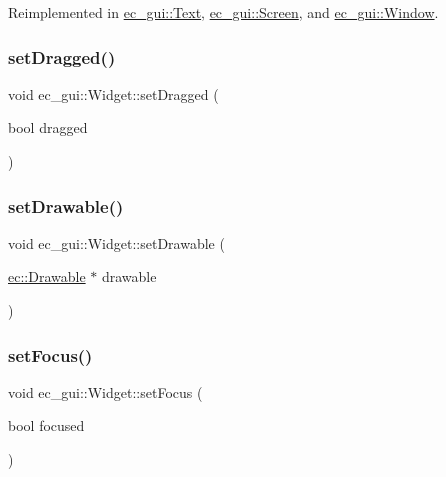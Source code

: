 Reimplemented in \mbox{\hyperlink{classec__gui_1_1_text_a08a431546765e0ff69951a4299193e7d}{ec\+\_\+gui\+::\+Text}}, \mbox{\hyperlink{classec__gui_1_1_screen_adf5a08d769e059f46261de227506cf9a}{ec\+\_\+gui\+::\+Screen}}, and \mbox{\hyperlink{classec__gui_1_1_window_a8a18cca8b005dcb88365ede4b5095dc9}{ec\+\_\+gui\+::\+Window}}.

\mbox{\label{classec__gui_1_1_widget_ac2b789cec74b8b5cfa0c6a8f4d6e786f}} 
\subsubsection{\texorpdfstring{set\+Dragged()}{setDragged()}}
{\footnotesize\ttfamily void ec\+\_\+gui\+::\+Widget\+::set\+Dragged (\begin{DoxyParamCaption}\item[{bool}]{dragged }\end{DoxyParamCaption})\hspace{0.3cm}{\ttfamily [virtual]}}

\mbox{\label{classec__gui_1_1_widget_a5919d406bf95a17160a073dac9b37bbe}} 
\subsubsection{\texorpdfstring{set\+Drawable()}{setDrawable()}}
{\footnotesize\ttfamily void ec\+\_\+gui\+::\+Widget\+::set\+Drawable (\begin{DoxyParamCaption}\item[{\mbox{\hyperlink{classec_1_1_drawable}{ec\+::\+Drawable}} $\ast$}]{drawable }\end{DoxyParamCaption})\hspace{0.3cm}{\ttfamily [virtual]}}

\mbox{\label{classec__gui_1_1_widget_a0f4c330b12beaac5cfbd97ecc1f4fee3}} 
\subsubsection{\texorpdfstring{set\+Focus()}{setFocus()}}
{\footnotesize\ttfamily void ec\+\_\+gui\+::\+Widget\+::set\+Focus (\begin{DoxyParamCaption}\item[{bool}]{focused }\end{DoxyParamCaption})\hspace{0.3cm}{\ttfamily [virtual]}}


